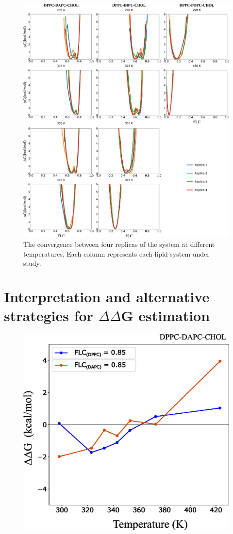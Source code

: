 \documentclass[10pt]{article}
\let\oldsection\section
\renewcommand{\section}{\clearpage\oldsection}
\begin{document}
\begin{figure}[H]
    \centering
    \includegraphics[width=6.5in]{Figures/Supplementary/ReplicaConvergence/placeholder.jpg}
    \caption{The convergence between four replicas of the system at different temperatures. Each column represents each lipid system under study.}
    \label{figs7:view}
\end{figure}

\section*{Interpretation and alternative strategies for $\Delta\Delta$G estimation}

\begin{figure}[H]
    \centering
    \includegraphics[width=6.5in]{Figures/Supplementary/AlternativeDelDelG/placeholder1.jpg}
    \caption{}
    \label{figs8:view}
\end{figure}



\end{document}
